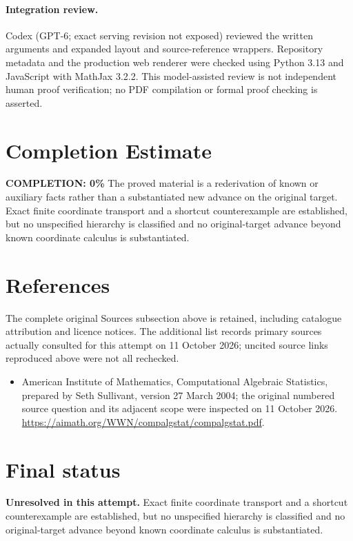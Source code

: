 \documentclass[11pt]{article}
\begin{document}
\paragraph{Integration review.} Codex (GPT-6; exact serving revision not exposed) reviewed the written arguments and expanded layout and source-reference wrappers. Repository metadata and the production web renderer were checked using Python 3.13 and JavaScript with MathJax 3.2.2. This model-assisted review is not independent human proof verification; no PDF compilation or formal proof checking is asserted.

\section{Completion Estimate}
\noindent\textbf{COMPLETION: 0\%}
The proved material is a rederivation of known or auxiliary facts rather than a substantiated new advance on the original target. Exact finite coordinate transport and a shortcut counterexample are established, but no unspecified hierarchy is classified and no original-target advance beyond known coordinate calculus is substantiated.
\section{References}
The complete original Sources subsection above is retained, including catalogue attribution and licence notices. The additional list records primary sources actually consulted for this attempt on 11 October 2026; uncited source links reproduced above were not all rechecked.
\begin{itemize}
\item American Institute of Mathematics, Computational Algebraic Statistics, prepared by Seth Sullivant, version 27 March 2004; the original numbered source question and its adjacent scope were inspected on 11 October 2026. \url{https://aimath.org/WWN/compalgstat/compalgstat.pdf}.
\end{itemize}
\section{Final status}
\textbf{Unresolved in this attempt.} Exact finite coordinate transport and a shortcut counterexample are established, but no unspecified hierarchy is classified and no original-target advance beyond known coordinate calculus is substantiated.
\end{document}
